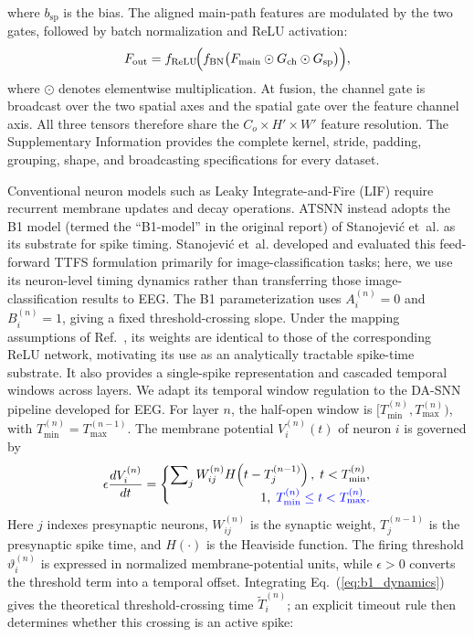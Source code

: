 \documentclass{nsr}
\begin{document}
where $b_{\mathrm{sp}}$ is the bias. The aligned main-path features are modulated by the two gates, followed by batch normalization and ReLU activation:
\begin{equation}
F_{\mathrm{out}} = f_{\mathrm{ReLU}}\!\Bigl(f_{\mathrm{BN}}\bigl(F_{\mathrm{main}}\odot G_{\mathrm{ch}}\odot G_{\mathrm{sp}}\bigr)\Bigr),
\label{eq:dsgm_out}
\end{equation}
where $\odot$ denotes elementwise multiplication. At fusion, the channel gate is broadcast over the two spatial axes and the spatial gate over the feature channel axis. All three tensors therefore share the $C_o\times H'\times W'$ feature resolution. The Supplementary Information provides the complete kernel, stride, padding, grouping, shape, and broadcasting specifications for every dataset.

Conventional neuron models such as Leaky Integrate-and-Fire (LIF) \cite{ref79} require recurrent membrane updates and decay operations. ATSNN instead adopts the B1 model (termed the ``B1-model'' in the original report) of Stanojevi\'{c} et~al. \cite{ref46} as its substrate for spike timing. Stanojevi\'{c} et~al. developed and evaluated this feed-forward TTFS formulation primarily for image-classification tasks; here, we use its neuron-level timing dynamics rather than transferring those image-classification results to EEG. The B1 parameterization uses $A_i^{(n)}=0$ and $B_i^{(n)}=1$, giving a fixed threshold-crossing slope. Under the mapping assumptions of Ref.~\cite{ref46}, its weights are identical to those of the corresponding ReLU network, motivating its use as an analytically tractable spike-time substrate. It also provides a single-spike representation and cascaded temporal windows across layers. We adapt its temporal window regulation to the DA-SNN pipeline developed for EEG. For layer $n$, the half-open window is $[T_{\min}^{(n)},T_{\max}^{(n)})$, with $T_{\min}^{(n)}=T_{\max}^{(n-1)}$. The membrane potential $V_i^{(n)}(t)$ of neuron $i$ is governed by
\begin{equation}
\label{eq:b1_dynamics}
\epsilon \frac{dV_i^{(n)}}{dt} =
\left\{
\begin{array}{@{}r@{}}
\displaystyle \sum\nolimits_j W_{ij}^{(n)} H\!\left(t-T_j^{(n-1)}\right),\; t < T_{\min}^{(n)},\\[0.4em]
1,\; {\color{blue}T_{\min}^{(n)} \le t < T_{\max}^{(n)}.}
\end{array}
\right.
\end{equation}
Here $j$ indexes presynaptic neurons, $W_{ij}^{(n)}$ is the synaptic weight, $T_j^{(n-1)}$ is the presynaptic spike time, and $H(\cdot)$ is the Heaviside function. The firing threshold $\vartheta_i^{(n)}$ is expressed in normalized membrane-potential units, while $\epsilon>0$ converts the threshold term into a temporal offset. Integrating Eq.~(\ref{eq:b1_dynamics}) gives the theoretical threshold-crossing time $\tilde{T}_i^{(n)}$; an explicit timeout rule then determines whether this crossing is an active spike:
\end{document}
